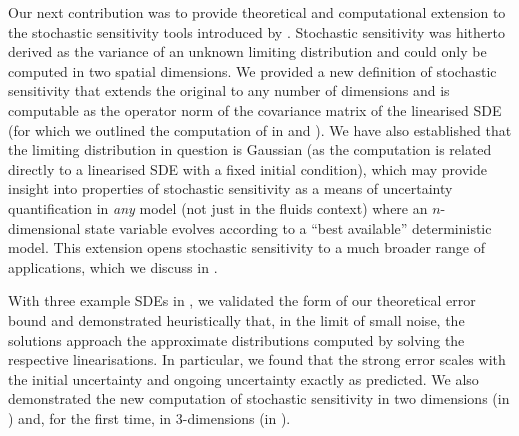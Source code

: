Our next contribution was to provide theoretical and computational extension to the stochastic sensitivity tools introduced by \citet{Balasuriya_2020_StochasticSensitivityComputable}.
Stochastic sensitivity was hitherto derived as the variance of an unknown limiting distribution and could only be computed in two spatial dimensions.
We provided a new definition of stochastic sensitivity that extends the original to any number of dimensions and is computable as the operator norm of the covariance matrix of the linearised SDE (for which we outlined the computation of in  and ).
We have also established that the limiting distribution in question is Gaussian (as the computation is related directly to a linearised SDE with a fixed initial condition), which may provide insight into properties of stochastic sensitivity as a means of uncertainty quantification in \emph{any} model (not just in the fluids context) where an \(n\)-dimensional state variable evolves according to a ``best available'' deterministic model.
This extension opens stochastic sensitivity to a much broader range of applications, which we discuss in .

With three example SDEs in , we validated the form of our theoretical error bound and demonstrated heuristically that, in the limit of small noise, the solutions approach the approximate distributions computed by solving the respective linearisations.
In particular, we found that the strong error scales with the initial uncertainty and ongoing uncertainty exactly as predicted.
We also demonstrated the new computation of stochastic sensitivity in two dimensions (in ) and, for the first time, in 3-dimensions (in ).


